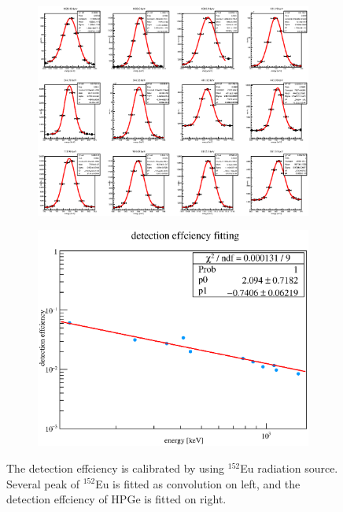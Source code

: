   \begin{figure}[H]
   \begin{subfigure}{0.3\textwidth}
    \centering
	\includegraphics[scale=0.46]{chapter4/fig/Eufit.eps}
   \end{subfigure}
   \hspace{0.25\textwidth}
   \begin{subfigure}{0.3\textwidth}
    \centering
	\includegraphics[scale=0.35]{chapter4/fig/detectioneff.eps}
   \end{subfigure}
   \caption{The detection effciency is calibrated by using $^{152}$Eu radiation source. Several peak of $^{152}$Eu is fitted as convolution on left, and the detection effciency of HPGe is fitted on right.}
   \label{3source}
  \end{figure}

